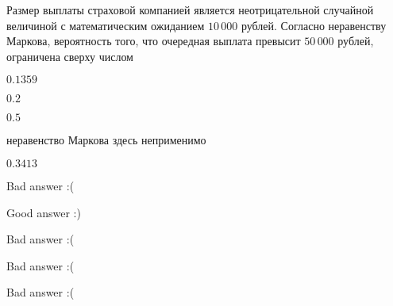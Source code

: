 
\begin{question}
Размер выплаты страховой компанией является неотрицательной случайной
величиной с математическим ожиданием \(10\,000\) рублей. Согласно
неравенству Маркова, вероятность того, что очередная выплата превысит
\(50\,000\) рублей, ограничена сверху числом
\begin{answerlist}
  \item \(0.1359\)
  \item \(0.2\)
  \item \(0.5\)
  \item неравенство Маркова здесь неприменимо
  \item \(0.3413\)
\end{answerlist}
\end{question}

\begin{solution}
\begin{answerlist}
  \item Bad answer :(
  \item Good answer :)
  \item Bad answer :(
  \item Bad answer :(
  \item Bad answer :(
\end{answerlist}
\end{solution}

